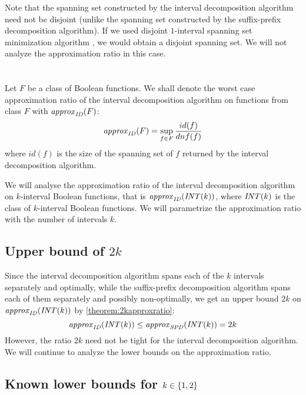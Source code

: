 Note that the spanning set constructed
by the interval decomposition algorithm
need not be disjoint
(unlike the spanning set constructed
by the suffix-prefix decomposition algorithm).
If we used \citeauthor{Schieber2005154}
disjoint $1$-interval spanning set minimization algorithm
\citep{Schieber2005154},
we would obtain a disjoint spanning set.
We will not analyze the approximation ratio in this case.

\section{\titleapproxratio}

Let $F$ be a class of Boolean functions.
We shall denote the worst case approximation ratio
of the interval decomposition algorithm
on functions from class $F$ with $\mathit{approx}_{\mathit{ID}} (F)$:
$$
\mathit{approx}_{\mathit{ID}} (F)
= \sup_{f \in F}{\frac{id(f)}{dnf(f)}}
$$
where $id(f)$ is the size of the spanning set of $f$
returned by the interval decomposition algorithm.

We will analyse the approximation ratio
of the interval decomposition algorithm
on $k$-interval Boolean functions,
that is $\mathit{approx}_{\mathit{ID}} (\mathit{INT} (k))$,
where $\mathit{INT} (k)$ is the class
of $k$-interval Boolean functions.
We will parametrize the approximation ratio
with the number of intervals $k$.

\subsection{Upper bound of $2k$}

Since the interval decomposition algorithm
spans each of the $k$ intervals separately and optimally,
while the suffix-prefix decomposition algorithm
spans each of them separately and possibly non-optimally,
we get an upper bound $2k$
on $\mathit{approx}_{\mathit{ID}} (\mathit{INT} (k))$ by \cref{theorem:2kapproxratio}:
$$
\mathit{approx}_{\mathit{ID}} (\mathit{INT} (k)) \leq \mathit{approx}_{\mathit{SPD}} (\mathit{INT} (k)) = 2k
$$
However,
the ratio $2k$ need not be tight
for the interval decomposition algorithm.
We will continue to analyze the lower bounds
on the approximation ratio.

\subsection{Known lower bounds for $k \in \{1, 2\}$}

